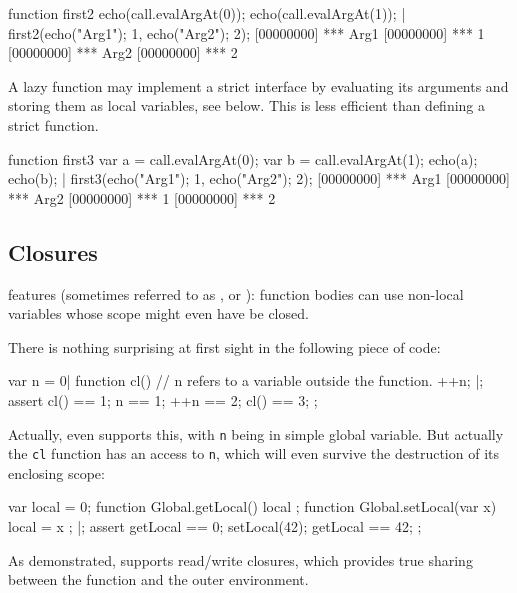 \begin{urbiscript}
function first2
{
  echo(call.evalArgAt(0));
  echo(call.evalArgAt(1));
}|
first2({echo("Arg1"); 1},
       {echo("Arg2"); 2});
[00000000] *** Arg1
[00000000] *** 1
[00000000] *** Arg2
[00000000] *** 2
\end{urbiscript}

A lazy function may implement a strict interface by evaluating its
arguments and storing them as local variables, see below.  This is
less efficient than defining a strict function.

\begin{urbiscript}
function first3
{
  var a = call.evalArgAt(0);
  var b = call.evalArgAt(1);
  echo(a); echo(b);
}|
first3({echo("Arg1"); 1},
       {echo("Arg2"); 2});
[00000000] *** Arg1
[00000000] *** Arg2
[00000000] *** 1
[00000000] *** 2
\end{urbiscript}

\subsection{Closures}
\label{sec:lang:closure}

\us features  (sometimes referred to as , or ): function bodies can use non-local
variables whose scope might even have be closed.

There is nothing surprising at first sight in the following piece of code:
\begin{urbiscript}
var n = 0|
function cl()
{
  // n refers to a variable outside the function.
  ++n;
}|;
assert
{
  cl() == 1;
     n == 1;
   ++n == 2;
  cl() == 3;
};
\end{urbiscript}

\noindent
Actually, even \langC supports this, with \lstinline{n} being in simple global
variable.  But actually the \lstinline{cl} function has  an
access to \lstinline{n}, which will even survive the destruction of its
enclosing scope:

\begin{urbiscript}
{
  var local = 0;
  function Global.getLocal() { local };
  function Global.setLocal(var x) { local = x };
}|;
assert
{
  getLocal == 0;
  setLocal(42);
  getLocal == 42;
};
\end{urbiscript}

As demonstrated, \us supports read/write closures, which provides true
sharing between the function and the outer environment.


